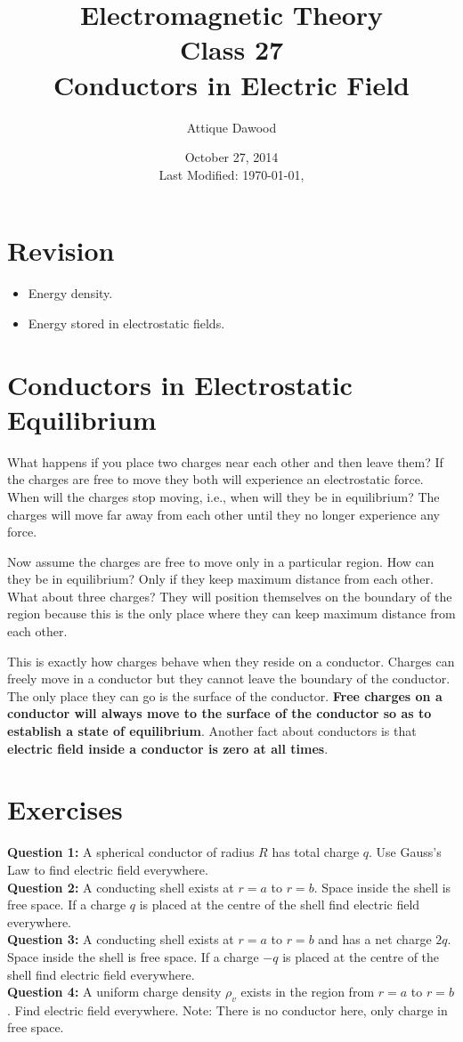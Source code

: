 \documentclass[12pt,a4paper]{article}
\title{Electromagnetic Theory\\Class 27\\Conductors in Electric Field}
\author{Attique Dawood}
\date{October 27, 2014\\[0.2cm] Last Modified: \today, \currenttime}
\begin{document}
\maketitle
\section{Revision}
\begin{itemize}
\item Energy density.
\item Energy stored in electrostatic fields.
\end{itemize}
\section{Conductors in Electrostatic Equilibrium}
What happens if you place two charges near each other and then leave them? If the charges are free to move they both will experience an electrostatic force. When will the charges stop moving, i.e., when will they be in equilibrium? The charges will move far away from each other until they no longer experience any force.

Now assume the charges are free to move only in a particular region. How can they be in equilibrium? Only if they keep maximum distance from each other. What about three charges? They will position themselves on the boundary of the region because this is the only place where they can keep maximum distance from each other.

This is exactly how charges behave when they reside on a conductor. Charges can freely move in a conductor but they cannot leave the boundary of the conductor. The only place they can go is the surface of the conductor. \textbf{Free charges on a conductor will always move to the surface of the conductor so as to establish a state of equilibrium}. Another fact about conductors is that \textbf{electric field inside a conductor is zero at all times}.
\section{Exercises}
\noindent\textbf{Question 1:} A spherical conductor of radius $R$ has total charge $q$. Use Gauss's Law to find electric field everywhere.\\[0.2cm]
\noindent\textbf{Question 2:} A conducting shell exists at $r=a$ to $r=b$. Space inside the shell is free space. If a charge $q$ is placed at the centre of the shell find electric field everywhere.\\[0.2cm]
\noindent\textbf{Question 3:} A conducting shell exists at $r=a$ to $r=b$ and has a net charge $2q$. Space inside the shell is free space. If a charge $-q$ is placed at the centre of the shell find electric field everywhere.\\[0.2cm]
\noindent\textbf{Question 4:} A uniform charge density $\rho_v$ exists in the region from $r=a$ to $r=b$. Find electric field everywhere. Note: There is no conductor here, only charge in free space.\\[0.2cm]
%
%
\end{document}
